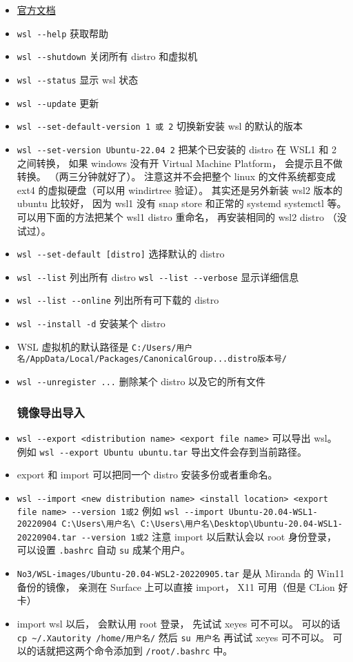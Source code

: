 \begin{itemize}
\item \href{https://docs.microsoft.com/en-us/windows/wsl/}{官方文档}
\item \verb`wsl --help` 获取帮助
\item \verb`wsl --shutdown` 关闭所有 distro 和虚拟机
\item \verb`wsl --status` 显示 wsl 状态
\item \verb`wsl --update` 更新
\item \verb`wsl --set-default-version 1 或 2` 切换新安装 wsl 的默认的版本
\item \verb`wsl --set-version Ubuntu-22.04 2` 把某个已安装的 distro 在 WSL1 和 2 之间转换， 如果 windows 没有开 Virtual Machine Platform， 会提示且不做转换。 （两三分钟就好了）。 注意这并不会把整个 linux 的文件系统都变成 ext4 的虚拟硬盘（可以用 windirtree 验证）。 其实还是另外新装 wsl2 版本的 ubuntu 比较好， 因为 wsl1 没有 snap store 和正常的 systemd systemctl 等。 可以用下面的方法把某个 wsl1 distro 重命名， 再安装相同的 wsl2 distro （没试过）。
\item \verb`wsl --set-default [distro]` 选择默认的 distro
\item \verb`wsl --list` 列出所有 distro \verb`wsl --list --verbose` 显示详细信息
\item \verb`wsl --list --online` 列出所有可下载的 distro
\item \verb`wsl --install -d` 安装某个 distro
\item WSL 虚拟机的默认路径是 \verb`C:/Users/用户名/AppData/Local/Packages/CanonicalGroup...distro版本号/`
\item \verb`wsl --unregister ...` 删除某个 distro 以及它的所有文件

\subsubsection{镜像导出导入}
\item \verb`wsl --export <distribution name> <export file name>` 可以导出 wsl。 例如 \verb`wsl --export Ubuntu ubuntu.tar` 导出文件会存到当前路径。
\item export 和 import 可以把同一个 distro 安装多份或者重命名。
\item \verb`wsl --import <new distribution name> <install location> <export file name> --version 1或2` 例如 \verb`wsl --import Ubuntu-20.04-WSL1-20220904 C:\Users\用户名\ C:\Users\用户名\Desktop\Ubuntu-20.04-WSL1-20220904.tar --version 1或2` 注意 import 以后默认会以 root 身份登录， 可以设置 \verb`.bashrc` 自动 \verb`su` 成某个用户。
\item \verb`No3/WSL-images/Ubuntu-20.04-WSL2-20220905.tar` 是从 Miranda 的 Win11 备份的镜像， 亲测在 Surface 上可以直接 import， X11 可用（但是 CLion 好卡）
\item import wsl 以后， 会默认用 root 登录， 先试试 xeyes 可不可以。 可以的话 \verb`cp ~/.Xautority /home/用户名/` 然后 \verb`su 用户名` 再试试 xeyes 可不可以。 可以的话就把这两个命令添加到 \verb`/root/.bashrc` 中。
\end{itemize}

